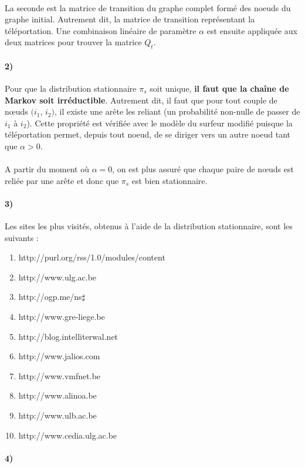 \documentclass[a4paper,titlepage]{report}
\begin{document}
\paragraph{}
La seconde est la matrice de transition du graphe complet formé des noeuds du graphe initial. Autrement dit, la matrice de transition représentant la téléportation. Une combinaison linéaire de paramètre $\alpha$ est ensuite appliquée aux deux matrices pour trouver la matrice $Q_t$.
\paragraph{2)}
Pour que la distribution stationnaire $\pi_s$ soit unique, \textbf{il faut que la chaîne de Markov soit irréductible}. Autrement dit, il faut que pour tout couple de nœuds $(i_1$, $i_2)$, il existe une arête les reliant (un probabilité non-nulle de passer de $i_1$ à $i_2$). Cette propriété est vérifiée avec le modèle du surfeur modifié puisque la téléportation permet, depuis tout noeud, de se diriger vers un autre noeud tant que $\alpha > 0$. 
\paragraph{}
A partir du moment où $\alpha = 0$, on est plus assuré que chaque paire de nœuds est reliée par une arête et donc que $\pi_s$ est bien stationnaire.
\paragraph{3)} 
Les sites les plus visités, obtenus à l'aide de la distribution stationnaire, sont les suivants :
\begin{enumerate}
	\item http://purl.org/rss/1.0/modules/content
    \item http://www.ulg.ac.be
    \item http://ogp.me/ns$\sharp$
    \item http://www.gre-liege.be
    \item http://blog.intelliterwal.net
    \item http://www.jalios.com
    \item http://www.vmfnet.be
    \item http://www.alinoa.be
    \item http://www.ulb.ac.be
    \item http://www.cedia.ulg.ac.be
\end{enumerate}
\paragraph{4)}
\end{document}
